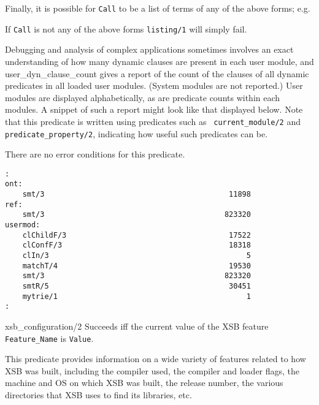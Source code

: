 \begin{description}
    Finally, it is possible for {\tt Call}
    to be a list of terms of any of the above forms; e.g.


    If {\tt Call} is not any of the above forms {\tt listing/1} will
    simply fail.


%
Debugging and analysis of complex applications sometimes involves an
exact understanding of how many dynamic clauses are present in each
user module, and {user\_dyn\_clause\_count} gives a report of the
count of the clauses of all dynamic predicates in all loaded user
modules.  (System modules are not reported.)  User modules are
displayed alphabetically, as are predicate counts within each modules.
A snippet of such a report might look like that displayed below.  Note
that this predicate is written using predicates such as {\tt
  current\_module/2} and {\tt predicate\_property/2}, indicating how
useful such predicates can be.

There are no error conditions for this predicate.

\begin{verbatim}
:
ont:
    smt/3                                          11898
ref:
    smt/3                                         823320
usermod:
    clChildF/3                                     17522
    clConfF/3                                      18318
    clIn/3                                             5
    matchT/4                                       19530
    smt/3                                         823320
    smtR/5                                         30451
    mytrie/1                                           1
:
\end{verbatim}

{xsb\_configuration/2}
    Succeeds iff the current value of the XSB  feature {\tt
    Feature\_Name} is {\tt Value}.

    This predicate provides information on a wide variety of features
    related to how XSB was built, including the compiler used, the compiler
    and loader flags, the machine and OS on which XSB was built, the
    release number, the various directories that XSB uses to find its
    libraries, etc.


\end{description}
